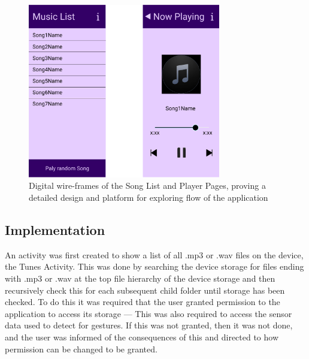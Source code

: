 \documentclass{l4proj}
\begin{document}
\begin{figure}[!htb]
    \centering
    \includegraphics[width=0.75\textwidth]{images/DigWireframes.PNG}
        \caption{Digital wire-frames of the Song List and Player Pages, proving a detailed design and platform for exploring flow of the application}
        \label{fig:digitalWF}
\end{figure}

\subsection{Implementation}
An activity was first created to show a list of all .mp3 or .wav files on the device, the Tunes Activity. This was done by searching the device storage for files ending with .mp3 or .wav at the top file hierarchy of the device storage and then recursively check this for each subsequent child folder until storage has been checked. To do this it was required that the user granted permission to the application to access its storage --- This was also required to access the sensor data used to detect for gestures. If this was not granted, then it was not done, and the user was informed of the consequences of this and directed to how permission can be changed to be granted.
\end{document}
